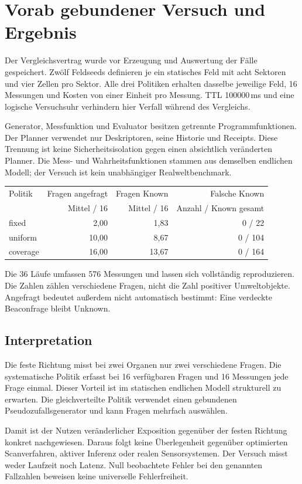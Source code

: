 \documentclass[11pt,a4paper]{article}
\newcommand{\nextsection}[2]{\clearpage{\color{accent}\small\textsf{#1}}\section{#2}}
\begin{document}
\nextsection{26 / EXPOSITIONSVERGLEICH}{Vorab gebundener Versuch und Ergebnis}
Der Vergleichsvertrag wurde vor Erzeugung und Auswertung
der Fälle gespeichert. Zwölf Feldseeds definieren je ein
statisches Feld mit acht Sektoren und vier Zellen pro Sektor.
Alle drei Politiken erhalten dasselbe jeweilige Feld,
16 Messungen und Kosten von einer Einheit pro Messung.
TTL 100000\,ms und eine logische Versuchsuhr verhindern
hier Verfall während des Vergleichs.

Generator, Messfunktion und Evaluator besitzen getrennte
Programmfunktionen. Der Planner verwendet nur Deskriptoren,
seine Historie und Receipts. Diese Trennung ist keine
Sicherheitsisolation gegen einen absichtlich veränderten Planner.
Die Mess- und Wahrheitsfunktionen stammen aus demselben
endlichen Modell; der Versuch ist kein unabhängiger
Realweltbenchmark.

\begin{tabularx}{\linewidth}{@{}lrrr@{}}
\toprule
Politik & Fragen angefragt & Fragen Known & Falsche Known\\
& Mittel / 16 & Mittel / 16 & Anzahl / Known gesamt\\\midrule
fixed & 2,00 & 1,83 & 0 / 22\\
uniform & 10,00 & 8,67 & 0 / 104\\
coverage & 16,00 & 13,67 & 0 / 164\\
\bottomrule
\end{tabularx}

Die 36 Läufe umfassen 576 Messungen und lassen sich
vollständig reproduzieren. Die Zahlen zählen verschiedene
Fragen, nicht die Zahl positiver Umweltobjekte.
Angefragt bedeutet außerdem nicht automatisch bestimmt:
Eine verdeckte Beaconfrage bleibt Unknown.

\subsection{Interpretation}
Die feste Richtung misst bei zwei Organen nur zwei verschiedene
Fragen. Die systematische Politik erfasst bei 16 verfügbaren
Fragen und 16 Messungen jede Frage einmal. Dieser Vorteil
ist im statischen endlichen Modell strukturell zu erwarten.
Die gleichverteilte Politik verwendet einen gebundenen
Pseudozufallsgenerator und kann Fragen mehrfach auswählen.

Damit ist der Nutzen veränderlicher Exposition gegenüber
der festen Richtung konkret nachgewiesen. Daraus folgt
keine Überlegenheit gegenüber optimierten Scanverfahren,
aktiver Inferenz oder realen Sensorsystemen. Der Versuch
misst weder Laufzeit noch Latenz. Null beobachtete Fehler
bei den genannten Fallzahlen beweisen keine universelle Fehlerfreiheit.
\end{document}
